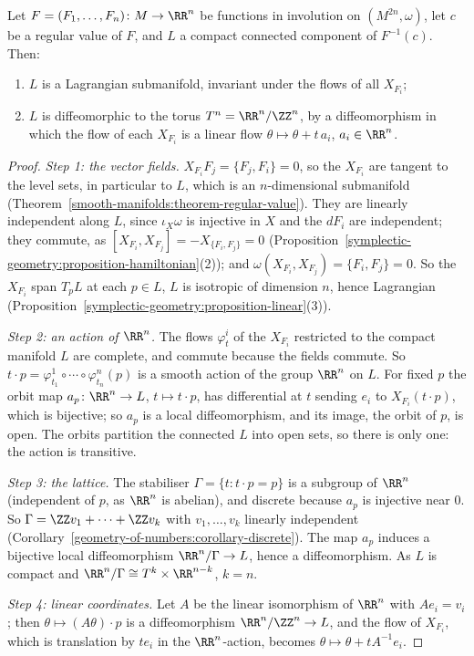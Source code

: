 \begin{theorem}\label{symplectic-geometry:theorem-liouville-arnold}
Let $F = (F_1, \ldots, F_n) \colon M \to \RR^n$ be functions in involution on $(M^{2n}, \omega)$, let $c$ be a regular value of $F$, and $L$ a compact connected component of $F^{-1}(c)$. Then:
\begin{enumerate}
\item $L$ is a Lagrangian submanifold, invariant under the flows of all $X_{F_i}$;
\item $L$ is diffeomorphic to the torus $T^n = \RR^n/\ZZ^n$, by a diffeomorphism in which the flow of each $X_{F_i}$ is a linear flow $\theta \mapsto \theta + t\,a_i$, $a_i \in \RR^n$.
\end{enumerate}
\end{theorem}

\begin{proof}
\emph{Step 1: the vector fields.} $X_{F_i}F_j = \{F_j, F_i\} = 0$, so the $X_{F_i}$ are tangent to the level sets, in particular to $L$, which is an $n$-dimensional submanifold
(Theorem~\ref{smooth-manifolds:theorem-regular-value}). They are linearly independent along $L$, since $\iota_{X}\omega$ is injective in $X$ and the $dF_i$ are independent; they commute, as
$[X_{F_i}, X_{F_j}] = -X_{\{F_i, F_j\}} = 0$ (Proposition~\ref{symplectic-geometry:proposition-hamiltonian}(2)); and $\omega(X_{F_i}, X_{F_j}) = \{F_i, F_j\} = 0$. So the $X_{F_i}$ span $T_pL$ at each $p \in L$, $L$ is
isotropic of dimension $n$, hence Lagrangian (Proposition~\ref{symplectic-geometry:proposition-linear}(3)).

\emph{Step 2: an action of $\RR^n$.} The flows $\varphi^i_t$ of the $X_{F_i}$ restricted to the compact manifold $L$ are complete, and commute because the fields commute. So
$t \cdot p = \varphi^1_{t_1} \circ \cdots \circ \varphi^n_{t_n}(p)$ is a smooth action of the group $\RR^n$ on $L$. For fixed $p$ the orbit map $a_p \colon \RR^n \to L$, $t \mapsto t \cdot p$, has differential at $t$ sending
$e_i$ to $X_{F_i}(t \cdot p)$, which is bijective; so $a_p$ is a local diffeomorphism, and its image, the orbit of $p$, is open. The orbits partition the connected $L$ into open sets, so there is only one: the action is
transitive.

\emph{Step 3: the lattice.} The stabiliser $\Gamma = \{t : t \cdot p = p\}$ is a subgroup of $\RR^n$ (independent of $p$, as $\RR^n$ is abelian), and discrete because $a_p$ is injective near $0$. So $\Gamma = \ZZ v_1 + \cdots + \ZZ v_k$
with $v_1, \ldots, v_k$ linearly independent (Corollary~\ref{geometry-of-numbers:corollary-discrete}). The map $a_p$ induces a bijective local diffeomorphism $\RR^n/\Gamma \to L$, hence a diffeomorphism. As $L$ is compact and
$\RR^n/\Gamma \cong T^k \times \RR^{n-k}$, $k = n$.

\emph{Step 4: linear coordinates.} Let $A$ be the linear isomorphism of $\RR^n$ with $Ae_i = v_i$; then $\theta \mapsto (A\theta) \cdot p$ is a diffeomorphism $\RR^n/\ZZ^n \to L$, and the flow of $X_{F_i}$, which is
translation by $te_i$ in the $\RR^n$-action, becomes $\theta \mapsto \theta + tA^{-1}e_i$.
\end{proof}

